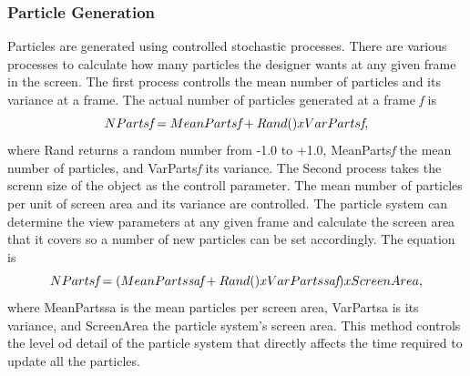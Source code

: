 \subsubsection{Particle Generation}
Particles are generated using controlled stochastic processes. There are various processes to calculate how many particles the designer wants at any given frame in the screen. The first process controlls the mean number of particles and its variance at a frame. The actual number of particles generated at a frame \emph{f} is 
\begin{equation}
\label{eqn:01}
	NParts\emph{f} = MeanParts\emph{f} + Rand() x VarParts\emph{f},
\end{equation}
where Rand returns a random number from -1.0 to +1.0, MeanParts\emph{f} the mean number of particles, and VarParts\emph{f} its variance.
	The Second process takes the screnn size of the object as the controll parameter. The mean number of particles per unit of screen area and its variance are controlled. The particle system can determine the view parameters at any given frame and calculate the screen area that it covers so a number of new particles can be set accordingly. The equation is
\begin{equation}
\label{eqn:01}
	NParts\emph{f} = (MeanParts\emph{sa}\emph{f} + Rand() x VarParts\emph{sa}\emph{f}) x ScreenArea,
\end{equation}
where MeanPartssa is the mean particles per screen area, VarPartsa is its variance, and ScreenArea the particle system's screen area. This method controls the level od detail of the particle system that directly affects the time required to update all the particles.
	
